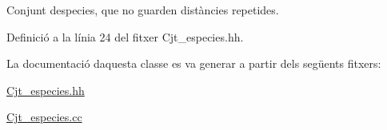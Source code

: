 Conjunt d\textquotesingle{}especies, que no guarden distàncies repetides. 



Definició a la línia 24 del fitxer Cjt\+\_\+especies.\+hh.



La documentació d\textquotesingle{}aquesta classe es va generar a partir dels següents fitxers\+:\begin{DoxyCompactItemize}
\item 
\hyperlink{_cjt__especies_8hh}{Cjt\+\_\+especies.\+hh}\item 
\hyperlink{_cjt__especies_8cc}{Cjt\+\_\+especies.\+cc}\end{DoxyCompactItemize}
